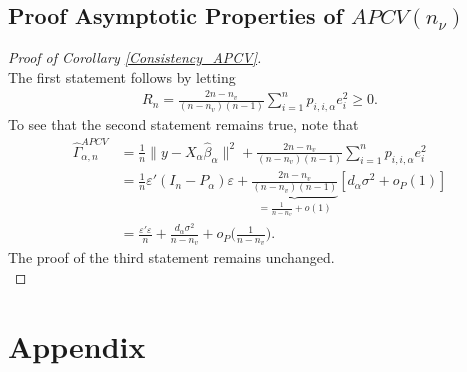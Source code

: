 \documentclass[Research_Module_ES.tex]{subfiles}
\begin{document}
\subsection*{Proof Asymptotic Properties of $APCV(n_\nu)$}
\begin{proof}[Proof of Corollary \ref{Consistency_APCV}]~\\
	The first statement follows by letting 
	\begin{align*}
	R_n= \frac{2n-n_v}{(n-n_v)(n-1)}\sum_{i=1}^np_{i,i,\alpha}e_i^2\ge 0.
	\end{align*}
	To see that the second statement remains true, note that
	\begin{align*}
	\hat{\Gamma}_{\alpha,n}^{APCV} &= \frac{1}{n}\lVert y-X_\alpha\hat{\beta}_\alpha\rVert^2 +\frac{2n-n_v}{(n-n_v)(n-1)}\sum_{i=1}^np_{i,i,\alpha}e_i^2\\
	&=\frac{1}{n} \varepsilon'(I_n-P_\alpha)\varepsilon+ \underbrace{\frac{2n-n_v}{(n-n_v)(n-1)}}_{=\frac{1}{n-n_v}+o(1)}[d_\alpha\sigma^2+o_P(1)]\\
	&=\frac{\varepsilon'\varepsilon}{n} + \frac{d_\alpha\sigma^2}{n-n_v}+o_P\biggl(\frac{1}{n-n_v}\biggr).
	\end{align*}
	The proof of the third statement remains unchanged. \\
\end{proof}

\section*{Appendix }
\end{document}
